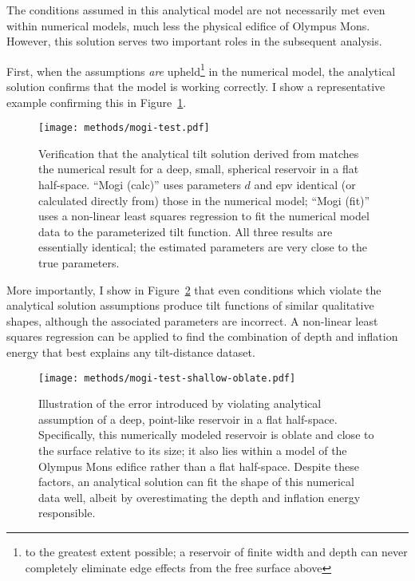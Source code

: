 
The conditions assumed in this analytical model are not necessarily met even within numerical models, much less the physical edifice of Olympus Mons. However, this solution serves two important roles in the subsequent analysis. 

First, when the assumptions \emph{are} upheld\footnote{to the greatest extent possible; a reservoir of finite width and depth can never completely eliminate edge effects from the free surface above} in the numerical model, the analytical solution confirms that the model is working correctly. I show a representative example confirming this in Figure~\ref{fig:mogi-test}.

\begin{figure}
    \texttt{[image: methods/mogi-test.pdf]}%
    \caption[Analytical solution verification]{Verification that the analytical tilt solution derived from \textcite{mogi_relations_1958} matches the numerical result for a deep, small, spherical reservoir in a flat half-space. ``Mogi (calc)'' uses parameters $d$ and \acs{epv} identical (or calculated directly from) those in the numerical model; ``Mogi (fit)'' uses a non-linear least squares regression to fit the numerical model data to the parameterized tilt function. All three results are essentially identical; the estimated parameters are very close to the true parameters.}%
    \label{fig:mogi-test}
\end{figure}

More importantly, I show in Figure~\ref{fig:mogi-test-shallow-oblate} that even conditions which violate the analytical solution assumptions produce tilt functions of similar qualitative shapes, although the associated parameters are incorrect. A non-linear least squares regression can be applied to find the combination of depth and inflation energy that best explains any tilt-distance dataset. 

\begin{figure}
    \texttt{[image: methods/mogi-test-shallow-oblate.pdf]}%
    \caption[Analytical model sensitivity to reservoir geometry]{Illustration of the error introduced by violating analytical assumption of a deep, point-like reservoir in a flat half-space. Specifically, this numerically modeled reservoir is oblate and close to the surface relative to its size; it also lies within a model of the Olympus Mons edifice rather than a flat half-space. Despite these factors, an analytical solution can fit the shape of this numerical data well, albeit by overestimating the depth and inflation energy responsible.}%
    \label{fig:mogi-test-shallow-oblate}
\end{figure}
